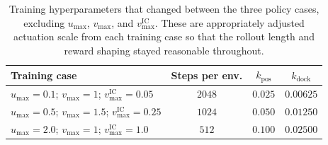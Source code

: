 \begin{table}[H]
\centering
\footnotesize
\caption{Training hyperparameters that changed between the three policy cases, excluding $u_{\max}$, $v_{\max}$, and $v_{\max}^{\mathrm{IC}}$. These are appropriately adjusted actuation scale from each training case so that the rollout length and reward shaping stayed reasonable throughout.}
\label{tab:training-hyperparameters-case-specific}
\begin{tabular}{@{}p{}ccc@{}}
\toprule
\textbf{Training case} & \textbf{Steps per env.} & \textbf{$k_{\mathrm{pos}}$} & \textbf{$k_{\mathrm{dock}}$} \\
\midrule
$u_{\max}=0.1$; $v_{\max}=1$; $v_{\max}^{\mathrm{IC}}=0.05$ & $2048$ & $0.025$ & $0.00625$ \\
$u_{\max}=0.5$; $v_{\max}=1.5$; $v_{\max}^{\mathrm{IC}}=0.25$ & $1024$ & $0.050$ & $0.01250$ \\
$u_{\max}=2.0$; $v_{\max}=1$; $v_{\max}^{\mathrm{IC}}=1.0$ & $512$ & $0.100$ & $0.02500$ \\
\bottomrule
\end{tabular}
\end{table}
